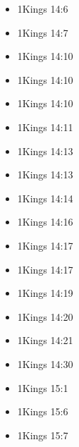 \documentclass[14pt]{article}
\begin{document}
\begin{multicols}{2}
\begin{itemize}
											\item 1Kings 14:6
											
											\item 1Kings 14:7
											
											\item 1Kings 14:10
											
											\item 1Kings 14:10
											
											\item 1Kings 14:10
											
											\item 1Kings 14:11
											
											\item 1Kings 14:13
											
											\item 1Kings 14:13
											
											\item 1Kings 14:14
											
											\item 1Kings 14:16
											
											\item 1Kings 14:17
											
											\item 1Kings 14:17
											
											\item 1Kings 14:19
											
											\item 1Kings 14:20
											
											\item 1Kings 14:21
											
											\item 1Kings 14:30
											
											\item 1Kings 15:1
											
											\item 1Kings 15:6
											
											\item 1Kings 15:7
											

\end{itemize}
\end{multicols}
\end{document}
